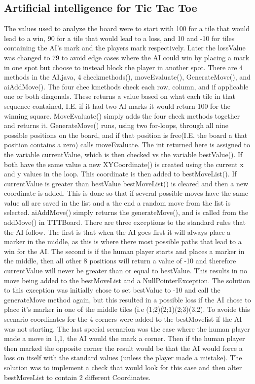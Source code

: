 \documentclass[a4paper,10pt]{article}
\begin{document}
\subsection{Artificial intelligence for Tic Tac Toe}
The values used to analyze the board were to start with 100 for a tile that would lead to a win, 90 for a tile that would lead to a loss, and 10 and -10 for tiles containing the AI’s mark and the players mark respectively. Later the lossValue was changed to 79 to avoid edge cases where the AI could win by placing a mark in one spot but choose to instead block the player in another spot.
There are 4 methods in the AI.java, 4 checkmethods(), moveEvaluate(), GenerateMove(), and aiAddMove().
The four chec kmethods check each row, column, and if applicable one or both diagonals. These returns a value based on what each tile in that sequence contained, I.E. if it had two AI marks it would return 100 for the winning square.
MoveEvaluate() simply adds the four check methods together and returns it.
GenerateMove() runs, using two for-loops, through all nine possible positions on the board, and if that position is free(I.E. the board a that position contains a zero) calls moveEvaluate. The int returned here is assigned to the variable currentValue, which is then checked vs the variable bestValue(). If both have the same value a new XYCoordinate() is created using the current x and y values in the loop. This coordinate is then added to bestMoveList(). If currentValue is greater than bestValue bestMoveList() is cleared and then a new coordinate is added. This is done so that if several possible moves have the same value all are saved in the list and a the end a random move from the list is selected.
aiAddMove() simply returns the generateMove(), and is called from the addMove() in TTTBoard.
There are three exceptions to the standard rules that the AI follow.
The first is that when the AI goes first it will always place a marker in the middle, as this is where there most possible paths that lead to a win for the AI.
The second is if the human player starts and places a marker in the middle, then all other 8 positions will return a value of -10 and therefore currentValue will never be greater than or equal to bestValue. This results in no move being added to the bestMoveList and a NullPointerException. The solution to this exception was initially chose to set bestValue to -10 and call the generateMove method again, but this resulted in a possible loss if the AI chose to place it’s marker in one of the middle tiles (i.e (1;2)(2;1)(2;3)(3,2). To avoide this scenario coordinates for the 4 corners were added to the bestMovelist if the AI was not starting.
The last special scenarion was the case where the human player made a move in 1,1, the AI would the mark a corner. Then if the human player then marked the opposite corner the result would be that the AI would force a loss on itself with the standard values (unless the player made a mistake). The solution was to implement a check that would look for this case and then alter bestMoveList to contain 2 different Coordinates.
\end{document}
